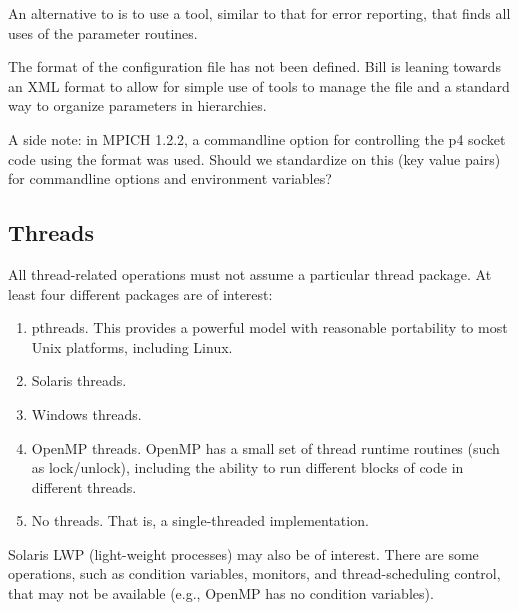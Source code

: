 \documentclass{article}
\begin{document}

An alternative to  is to use a tool, similar to that
for error reporting, that finds all uses of the parameter routines.


The format of the configuration file has not been defined.  Bill is leaning
towards an XML format to allow for simple use of tools to manage the file and
a standard way to organize parameters in hierarchies.

A side note: in MPICH 1.2.2, a commandline option for controlling the
p4 socket code using the format 
was used.  Should we standardize on this (key \code{=} value pairs)
for commandline options and environment variables?

\subsection{Threads}
\label{sec:threads}
All thread-related operations must not assume a particular thread
package.  At least four different packages are of interest:
\begin{enumerate}
\item pthreads.  This provides a powerful model with reasonable
portability to most Unix platforms, including Linux.  
\item Solaris threads.
\item Windows threads.  
\item OpenMP threads.  OpenMP has a small set of thread runtime
routines (such as lock/unlock), including the ability to run different blocks
of code in different threads.
\item No threads.  That is, a single-threaded implementation.  
\end{enumerate}
Solaris LWP (light-weight processes) may also be of interest.
There are some operations, such as condition variables, monitors, and
thread-scheduling control, that may not be available (e.g., OpenMP
has no condition variables).  
\end{document}
